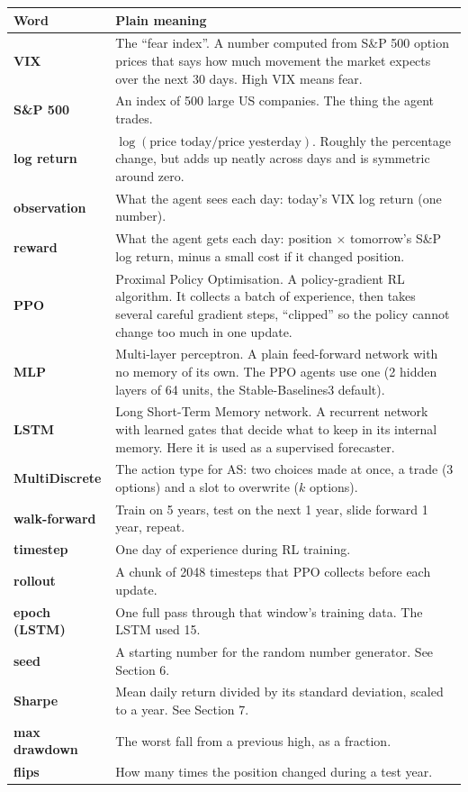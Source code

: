 \documentclass[11pt,a4paper]{article}
\begin{document}
\begin{longtable}{>{\bfseries}p{2.6cm} p{12.2cm}}
\toprule
Word & Plain meaning \\
\midrule
\endhead
VIX & The ``fear index''. A number computed from S\&P 500 option prices that says how much
  movement the market expects over the next 30 days. High VIX means fear. \\
S\&P 500 & An index of 500 large US companies. The thing the agent trades. \\
log return & $\log(\text{price today} / \text{price yesterday})$. Roughly the percentage
  change, but adds up neatly across days and is symmetric around zero. \\
observation & What the agent sees each day: today's VIX log return (one number). \\
reward & What the agent gets each day: position $\times$ tomorrow's S\&P log return, minus a
  small cost if it changed position. \\
PPO & Proximal Policy Optimisation. A policy-gradient RL algorithm. It collects a batch of
  experience, then takes several careful gradient steps, ``clipped'' so the policy cannot
  change too much in one update. \\
MLP & Multi-layer perceptron. A plain feed-forward network with no memory of its own. The
  PPO agents use one (2 hidden layers of 64 units, the Stable-Baselines3 default). \\
LSTM & Long Short-Term Memory network. A recurrent network with learned gates that decide
  what to keep in its internal memory. Here it is used as a supervised forecaster. \\
MultiDiscrete & The action type for AS: two choices made at once, a trade (3 options) and a
  slot to overwrite ($k$ options). \\
walk-forward & Train on 5 years, test on the next 1 year, slide forward 1 year, repeat. \\
timestep & One day of experience during RL training. \\
rollout & A chunk of 2048 timesteps that PPO collects before each update. \\
epoch (LSTM) & One full pass through that window's training data. The LSTM used 15. \\
seed & A starting number for the random number generator. See Section 6. \\
Sharpe & Mean daily return divided by its standard deviation, scaled to a year. See
  Section 7. \\
max drawdown & The worst fall from a previous high, as a fraction. \\
flips & How many times the position changed during a test year. \\
\bottomrule
\end{longtable}
\end{document}
